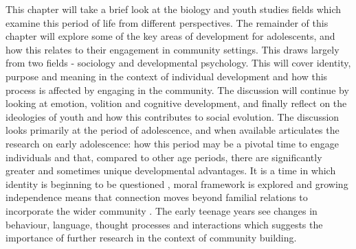 This chapter will take a brief look at the biology and youth studies fields which examine this period of life from different perspectives. The remainder of this chapter will explore some of the key areas of development for adolescents, and how this relates to their engagement in community settings. This draws largely from two fields - sociology and developmental psychology. This will cover identity, purpose and meaning in the context of individual development and how this process is affected by engaging in the community. The discussion will continue by looking at emotion, volition and cognitive development, and finally reflect on the ideologies of youth and how this contributes to social evolution. The discussion looks primarily at the period of adolescence, and when available articulates the research on early adolescence: how this period may be a pivotal time to engage individuals and that, compared to other age periods, there are significantly greater and sometimes unique developmental advantages. It is a time in which identity is beginning to be questioned \citep{Verlande2002,Finkenauer2012,Little2016}, moral framework is explored \citep{Fabes1999,Carlo1999} and growing independence means that connection moves beyond familial relations to incorporate the wider community \citep{Eccles2002a}. The early teenage years see changes in behaviour, language, thought processes and interactions which suggests the importance of further research in the context of community building. 


